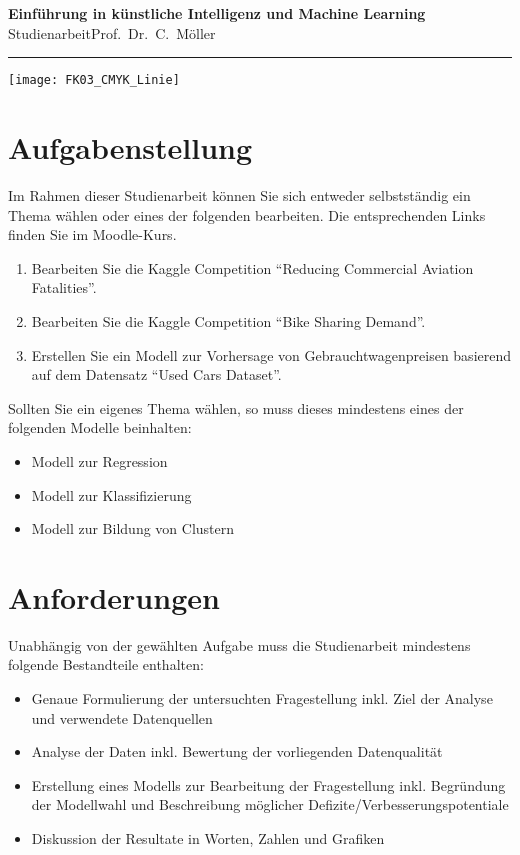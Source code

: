 \documentclass[11pt,a4paper]{article}
\newcommand{\veranstaltung}{Einführung in künstliche Intelligenz und Machine Learning}
\begin{document}
\sffamily

\setcounter{page}{1}
\begin{minipage}[l]{10cm}
	{\bfseries\veranstaltung}\\
	Studienarbeit\hfill Prof.~Dr.~C.~Möller
	\noindent\rule{\textwidth}{1pt}
\end{minipage}
\hfill
\begin{minipage}[r]{5cm}
\texttt{[image: FK03\_CMYK\_Linie]}
\end{minipage}
\vspace{5mm}


\section*{Aufgabenstellung}
Im Rahmen dieser Studienarbeit können Sie sich entweder selbstständig ein Thema wählen oder eines der folgenden bearbeiten. Die entsprechenden Links finden Sie im Moodle-Kurs.
\begin{enumerate}
	\item Bearbeiten Sie die Kaggle Competition "`Reducing Commercial Aviation Fatalities"'.
	\item Bearbeiten Sie die Kaggle Competition "`Bike Sharing Demand"'.
	\item Erstellen Sie ein Modell zur Vorhersage von Gebrauchtwagenpreisen basierend auf dem Datensatz "`Used Cars Dataset"'.
\end{enumerate}
Sollten Sie ein eigenes Thema wählen, so muss dieses mindestens eines der folgenden Modelle beinhalten:
\begin{itemize}
	\item Modell zur Regression
	\item Modell zur Klassifizierung
	\item Modell zur Bildung von Clustern
\end{itemize}

\section*{Anforderungen}
Unabhängig von der gewählten Aufgabe muss die Studienarbeit mindestens folgende Bestandteile enthalten:
\begin{itemize}
	\item Genaue Formulierung der untersuchten Fragestellung inkl. Ziel der Analyse und verwendete Datenquellen
	\item Analyse der Daten inkl. Bewertung der vorliegenden Datenqualität
	\item Erstellung eines Modells zur Bearbeitung der Fragestellung inkl. Begründung der Modellwahl und Beschreibung möglicher Defizite/Verbesserungspotentiale
	\item Diskussion der Resultate in Worten, Zahlen und Grafiken
\end{itemize}
\end{document}
